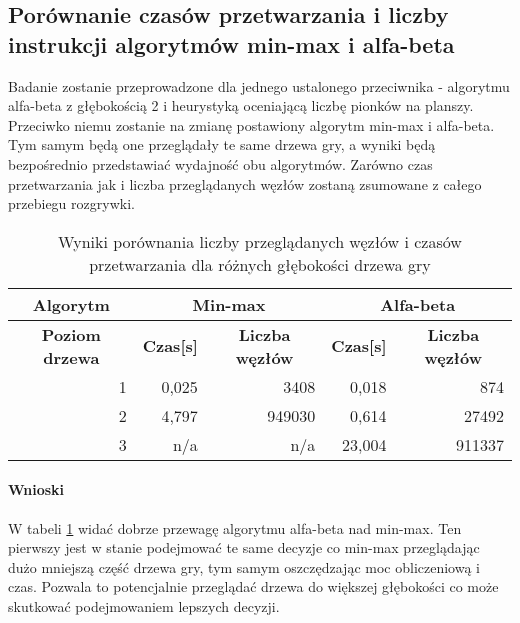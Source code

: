 \documentclass{article}
\begin{document}
	\subsection{Porównanie czasów przetwarzania i liczby instrukcji algorytmów min-max i alfa-beta}
	Badanie zostanie przeprowadzone dla jednego ustalonego przeciwnika - algorytmu alfa-beta z głębokością 2 i heurystyką oceniającą liczbę pionków na planszy. Przeciwko niemu zostanie na zmianę postawiony algorytm min-max i alfa-beta. Tym samym będą one przeglądały te same drzewa gry, a wyniki będą bezpośrednio przedstawiać wydajność obu algorytmów. Zarówno czas przetwarzania jak i liczba przeglądanych węzłów zostaną zsumowane z całego przebiegu rozgrywki.
	\begin{table}[H]
		\label{tab:comparison}
		\caption{Wyniki porównania liczby przeglądanych węzłów i czasów przetwarzania dla różnych głębokości drzewa gry}
		\begin{tabular}{|r|r|r|r|r|}
			\hline
			\multicolumn{1}{|c|}{\textbf{Algorytm}}      & \multicolumn{2}{c|}{\textbf{Min-max}}                                                   & \multicolumn{2}{c|}{\textbf{Alfa-beta}}                                                 \\ \hline
			\multicolumn{1}{|c|}{\textbf{Poziom drzewa}} & \multicolumn{1}{c|}{\textbf{Czas{[}s{]}}} & \multicolumn{1}{c|}{\textbf{Liczba węzłów}} & \multicolumn{1}{c|}{\textbf{Czas{[}s{]}}} & \multicolumn{1}{c|}{\textbf{Liczba węzłów}} \\ \hline
			1                                            & 0,025                                     & 3408                                        & 0,018                                     & 874                                         \\ \hline
			2                                            & 4,797                                     & 949030                                      & 0,614                                     & 27492                                       \\ \hline
			3                                            & n/a                                       & n/a                                         & 23,004                                    & 911337                                      \\ \hline
		\end{tabular}
	\end{table}
	\paragraph{Wnioski}
	W tabeli \ref{tab:comparison} widać dobrze przewagę algorytmu alfa-beta nad min-max. Ten pierwszy jest w stanie podejmować te same decyzje co min-max przeglądając dużo mniejszą część drzewa gry, tym samym oszczędzając moc obliczeniową i czas. Pozwala to potencjalnie przeglądać drzewa do większej głębokości co może skutkować podejmowaniem lepszych decyzji.
	
\end{document}

